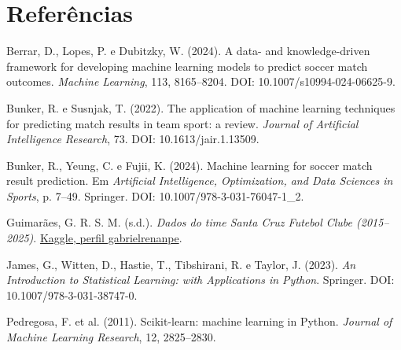 \documentclass[12pt]{article}
\begin{document}
\section*{Referências}
\noindent Berrar, D., Lopes, P. e Dubitzky, W. (2024). A data- and knowledge-driven framework for developing machine learning models to predict soccer match outcomes. \textit{Machine Learning}, 113, 8165--8204. DOI: 10.1007/s10994-024-06625-9.

\noindent Bunker, R. e Susnjak, T. (2022). The application of machine learning techniques for predicting match results in team sport: a review. \textit{Journal of Artificial Intelligence Research}, 73. DOI: 10.1613/jair.1.13509.

\noindent Bunker, R., Yeung, C. e Fujii, K. (2024). Machine learning for soccer match result prediction. Em \textit{Artificial Intelligence, Optimization, and Data Sciences in Sports}, p. 7--49. Springer. DOI: 10.1007/978-3-031-76047-1\_2.

\noindent Guimarães, G. R. S. M. (s.d.). \textit{Dados do time Santa Cruz Futebol Clube (2015--2025)}. \href{https://www.kaggle.com/datasets/gabrielrenanpe/dados-do-time-santa-cruz-futebol-clube-2015-2025}{Kaggle, perfil gabrielrenanpe}.

\noindent James, G., Witten, D., Hastie, T., Tibshirani, R. e Taylor, J. (2023). \textit{An Introduction to Statistical Learning: with Applications in Python}. Springer. DOI: 10.1007/978-3-031-38747-0.

\noindent Pedregosa, F. et al. (2011). Scikit-learn: machine learning in Python. \textit{Journal of Machine Learning Research}, 12, 2825--2830.
\end{document}

